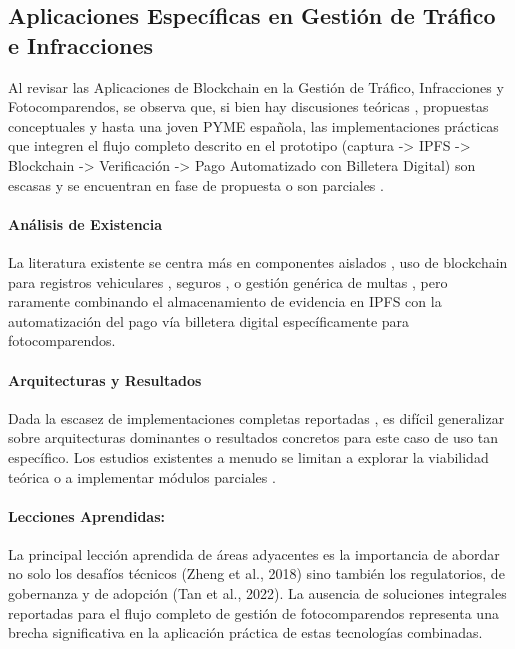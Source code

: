 \documentclass[
    letterpaper, 
    man,   
    spanish,
    12pt,
    donotrepeattitle,
    floatsintext,
    hidelinks %
]{apa7}
\begin{document}
\subsection{Aplicaciones Específicas en Gestión de Tráfico e Infracciones} 

Al revisar las Aplicaciones de Blockchain en la Gestión de Tráfico, Infracciones y Fotocomparendos, se observa que, si bien hay discusiones teóricas \parencite{yousfi2022its}, propuestas conceptuales \parencite{chen2024blockchain} y hasta una joven PYME española, las implementaciones prácticas que integren el flujo completo descrito en el prototipo (captura -> IPFS -> Blockchain -> Verificación -> Pago Automatizado con Billetera Digital) son escasas y se encuentran en fase de propuesta o son parciales \parencite{omar2024srtm,choquevilca2024blockchain}. 

\paragraph{Análisis de Existencia}
La literatura existente se centra más en componentes aislados \parencite{yousfi2022its}, uso de blockchain para registros vehiculares \parencite{ManiJosephP2023SmartAS}, seguros \parencite{dutta2023solution}, o gestión genérica de multas \parencite{omar2024srtm}, pero raramente combinando el almacenamiento de evidencia en IPFS con la automatización del pago vía billetera digital específicamente para fotocomparendos.

\paragraph{Arquitecturas y Resultados} Dada la escasez de implementaciones completas reportadas \parencite{AnandSingh_ProjectReport_Year,juit2024traffic}, es difícil generalizar sobre arquitecturas dominantes o resultados concretos para este caso de uso tan específico. Los estudios existentes a menudo se limitan a explorar la viabilidad teórica o a implementar módulos parciales \parencite{choquevilca2024blockchain}.

\paragraph{Lecciones Aprendidas:} La principal lección aprendida de áreas adyacentes es la importancia de abordar no solo los desafíos técnicos (Zheng et al., 2018) sino también los regulatorios, de gobernanza y de adopción (Tan et al., 2022). La ausencia de soluciones integrales reportadas para el flujo completo de gestión de fotocomparendos representa una brecha significativa en la aplicación práctica de estas tecnologías combinadas.
\end{document}
